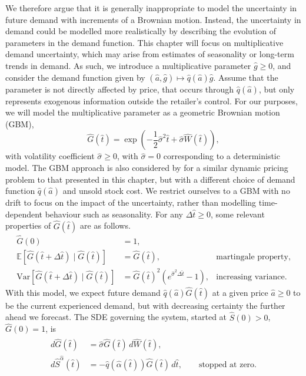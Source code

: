 \documentclass[main.tex]{subfiles}
\begin{document}
We therefore argue that it is generally inappropriate to model the uncertainty
in future demand with increments of a Brownian motion. Instead, the
uncertainty in demand could be modelled more realistically by
describing the evolution of parameters in the demand function.
This chapter will focus on multiplicative demand
uncertainty, which may arise from estimates of seasonality or
long-term trends in demand. As such, we introduce a multiplicative
parameter $\hat{g}\geq 0$, and consider the demand function given by
$({\hat{a}},\hat{g})\mapsto \hat{q}(\hat{a})\hat{g}$.
Assume that the parameter is not directly
affected by price, that occurs through $\hat{q}(\hat{a})$,
but  only represents exogenous information outside the
retailer's control.
For our purposes, we will model the multiplicative parameter as
a geometric Brownian motion (GBM),
\begin{equation}
  \hat{G}(\hat{t}) = \exp\left(
    -\frac{1}{2}\hat{\sigma}^2\hat{t} +\hat{\sigma}
    \hat{W}(\hat{t})\right),
\end{equation}
with volatility coefficient
$\hat{\sigma}\geq 0$, with $\hat{\sigma}=0$ corresponding to a
deterministic model. The GBM approach is also considered
by \citet{xu2006monopolistic} for a similar dynamic pricing problem to
that presented in this chapter, but with a different choice of demand function
$\hat{q}(\hat{a})$ and unsold stock cost.
We restrict ourselves to a GBM with no
drift to focus on the impact of the uncertainty, rather than modelling
time-dependent behaviour such as seasonality.
For any $\Delta{\hat{t}}\geq 0$, some relevant properties of $\hat{G}(\hat{t})$ are as follows.
\begin{align}
  \hat{G}(0)
  &=1,\\
  \mathbb{E}[\hat{G}(\hat{t}+\Delta{\hat{t}})\mid \hat{G}(\hat{t})]
  &=\hat{G}(\hat{t}),
  &\text{martingale property,}\\
  \mbox{Var}[\hat{G}(\hat{t}+\Delta{\hat{t}})\mid
  \hat{G}(\hat{t})]&={\hat{G}(\hat{t})}^2(e^{\hat{\sigma}^2
                     \Delta{\hat{t}}}-1), & \text{increasing variance.}
\end{align}
With this model, we expect future demand $\hat{q}(\hat{a})\hat{G}(\hat{t})$ at a given price $\hat{a}\geq
0$ to be the current experienced demand, but with decreasing certainty
the further ahead we forecast.
The SDE governing the system, started at
$\hat{S}(0)>0$, $\hat{G}(0)=1$, is
\begin{align}
  \begin{split}\label{eq:gbm_sde}
    d\hat{G}(\hat{t})&=\hat{\sigma} \hat{G}(\hat{t})\,d\hat{W}(\hat{t}),\\
    d\hat{S}^{\hat{\alpha}}(\hat{t})&=-\hat{q}(\hat{\alpha}(\hat{t}))\hat{G}(\hat{t})\,
    d\hat{t},\qquad\text{stopped at zero}.
  \end{split}
\end{align}
\end{document}

